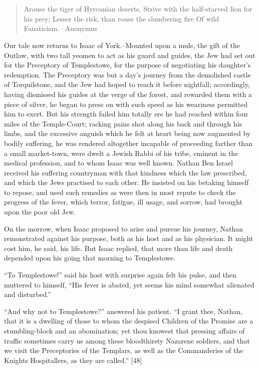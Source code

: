 \chapter{}

\begin{quote}
Arouse the tiger of Hyrcanian deserts,
Strive with the half-starved lion for his prey;
Lesser the risk, than rouse the slumbering fire
Of wild Fanaticism.
--Anonymus
\end{quote}

Our tale now returns to Isaac of York.--Mounted upon a mule, the gift of
the Outlaw, with two tall yeomen to act as his guard and guides, the Jew
had set out for the Preceptory of Templestowe, for the purpose of
negotiating his daughter's redemption. The Preceptory was but a day's
journey from the demolished castle of Torquilstone, and the Jew had
hoped to reach it before nightfall; accordingly, having dismissed his
guides at the verge of the forest, and rewarded them with a piece of
silver, he began to press on with such speed as his weariness permitted
him to exert. But his strength failed him totally ere he had reached
within four miles of the Temple-Court; racking pains shot along his back
and through his limbs, and the excessive anguish which he felt at heart
being now augmented by bodily suffering, he was rendered altogether
incapable of proceeding farther than a small market-town, were dwelt a
Jewish Rabbi of his tribe, eminent in the medical profession, and to
whom Isaac was well known. Nathan Ben Israel received his suffering
countryman with that kindness which the law prescribed, and which the
Jews practised to each other. He insisted on his betaking himself to
repose, and used such remedies as were then in most repute to check the
progress of the fever, which terror, fatigue, ill usage, and sorrow, had
brought upon the poor old Jew.

On the morrow, when Isaac proposed to arise and pursue his journey,
Nathan remonstrated against his purpose, both as his host and as his
physician. It might cost him, he said, his life. But Isaac replied, that
more than life and death depended upon his going that morning to
Templestowe.

``To Templestowe!'' said his host with surprise again felt his pulse,
and then muttered to himself, ``His fever is abated, yet seems his mind
somewhat alienated and disturbed.''

``And why not to Templestowe?'' answered his patient. ``I grant thee,
Nathan, that it is a dwelling of those to whom the despised Children of
the Promise are a stumbling-block and an abomination; yet thou knowest
that pressing affairs of traffic sometimes carry us among these
bloodthirsty Nazarene soldiers, and that we visit the Preceptories of
the Templars, as well as the Commanderies of the Knights Hospitallers,
as they are called.'' {[}48{]}


